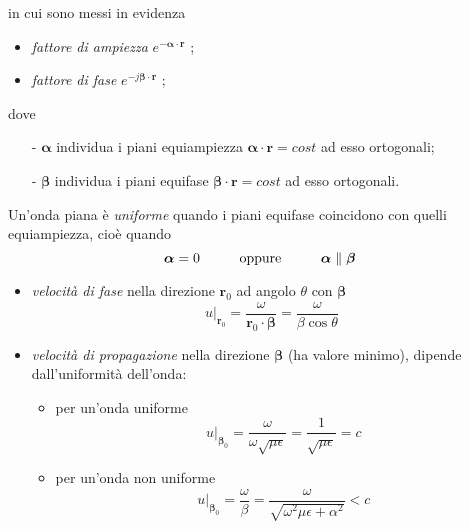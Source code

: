 \documentclass[a4paper]{article}
\begin{document}
in cui sono messi in evidenza
\begin{itemize}
\item \emph{fattore di ampiezza} $e^{-\bm{\alpha}\cdot\textbf{r}}$ ;
\item \emph{fattore di fase} $e^{-j\bm{\beta}\cdot\textbf{r}}$ ;
\end{itemize}
dove
\begin{itemize}
\item[-] $\bm{\alpha}$ individua i piani equiampiezza $\bm{\alpha}\cdot\bm{r}=cost$ ad esso ortogonali;
\item[-] $\bm{\beta}$ individua i piani equifase $\bm{\beta}\cdot\bm{r}=cost$ ad esso ortogonali.
\end{itemize}
Un'onda piana è \emph{uniforme} quando i piani equifase coincidono con quelli equiampiezza, cioè quando
\begin{equation*}
\bm{\alpha}=0\hspace{10mm}\text{oppure}\hspace{10mm}\bm{\alpha}\parallel\bm{\beta}
\end{equation*}
\begin{itemize}
\item \emph{velocità di fase} nella direzione $\textbf{r}_0$ ad angolo $\theta$ con $\bm{\beta}$
\begin{equation*}
u\big|_{\bm{r}_0}=\frac{\omega}{\bm{r}_0\cdot\bm{\beta}}=\frac{\omega}{\beta\cos\theta}
\end{equation*}
\item \emph{velocità di propagazione} nella direzione $\bm{\beta}$ (ha valore minimo), dipende dall'uniformità dell'onda:
\begin{itemize}
\item per un'onda uniforme
\begin{equation*}
u\big|_{\bm{\beta}_0}=\frac{\omega}{\omega\sqrt{\mu\epsilon}}=\frac{1}{\sqrt{\mu\epsilon}}=c
\end{equation*}
\item per un'onda non uniforme
\begin{equation*}
u\big|_{\bm{\beta}_0}=\frac{\omega}{\beta}=\frac{\omega}{\sqrt{\omega^2\mu\epsilon+\alpha^2}}<c
\end{equation*}
\end{itemize}
\end{itemize}
\end{document}
